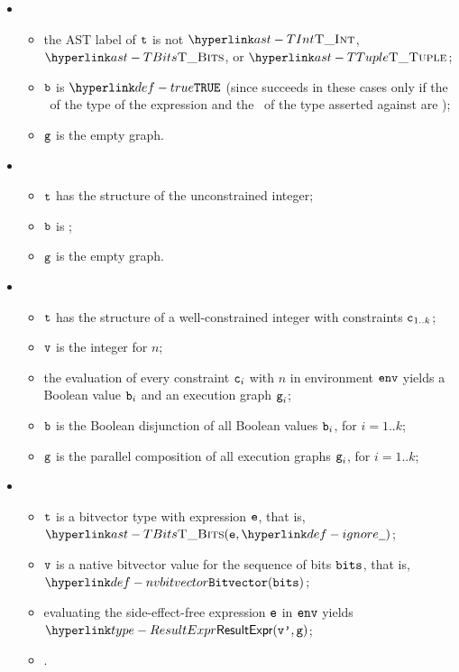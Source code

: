 \OneApplies
\begin{itemize}
  \item {}
  \begin{itemize}
    \item the AST label of $\texttt{t}$ is not $\TInt$, $\TBits$, or $\TTuple$;
    \item $\texttt{b}$ is $\True$ (since 
    succeeds in these cases only if the \structure\ of the type of the expression and the \structure\ of the type asserted against are \typeequivalent);
    \item $\texttt{g}$ is the empty graph.
  \end{itemize}

  \item {}
  \begin{itemize}
    \item $\texttt{t}$ has the structure of the unconstrained integer;
    \item $\texttt{b}$ is \True;
    \item $\texttt{g}$ is the empty graph.
  \end{itemize}

  \item {}
  \begin{itemize}
    \item $\texttt{t}$ has the structure of a well-constrained integer with constraints $\texttt{c}_{1..k}$;
    \item $\texttt{v}$ is the \nativevalueterm{}  integer for $n$;
    \item the evaluation of every constraint $\texttt{c}_i$ with $n$ in environment $\texttt{env}$
          yields a Boolean value $\texttt{b}_i$ and an execution graph $\texttt{g}_i$\ProseOrDynErrorDiverging;
    \item $\texttt{b}$ is the Boolean disjunction of all Boolean values $\texttt{b}_i$, for $i=1..k$;
    \item $\texttt{g}$ is the parallel composition of all execution graphs $\texttt{g}_i$, for $i=1..k$;
  \end{itemize}

  \item {}
  \begin{itemize}
    \item $\texttt{t}$ is a bitvector type with expression $\texttt{e}$, that is, $\TBits(\ve, \Ignore)$;
    \item $\texttt{v}$ is a native bitvector value for the sequence of bits $\texttt{bits}$, that is, \\ $\nvbitvector(\vbits)$;
    \item evaluating the side-effect-free expression $\texttt{e}$ in $\texttt{env}$ yields $\ResultExpr(\vvp, \vg)$\ProseOrDynErrorDiverging;
    \item {}.
  \end{itemize}


\end{itemize}
